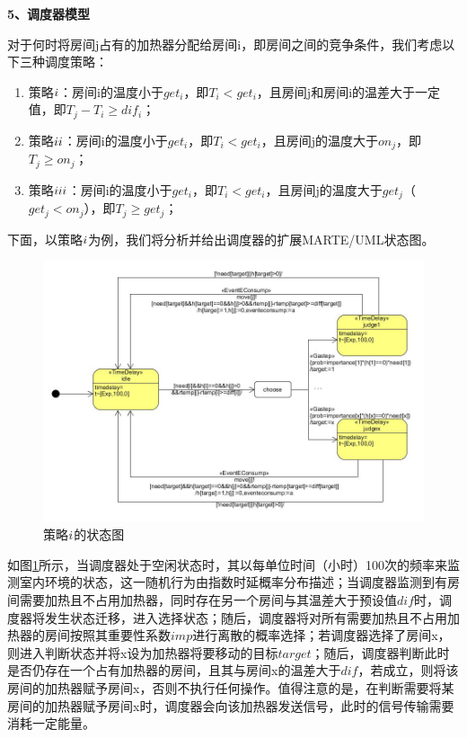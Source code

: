 \textbf{5、调度器模型}	

	对于何时将房间j占有的加热器分配给房间i，即房间之间的竞争条件，我们考虑以下三种调度策略：	
	\begin{enumerate}
	\item 策略$\uppercase\expandafter{\romannumeral1}$：房间i的温度小于$get_{i}$，即$T_{i} < get_{i}$，且房间j和房间i的温差大于一定值，即$T_{j}-T_{i} \geq dif_{i}$；
	\item 策略$\uppercase\expandafter{\romannumeral2}$：房间i的温度小于$get_{i}$，即$T_{i} < get_{i}$，且房间j的温度大于$on_{j}$，即$T_{j} \geq on_{j}$；
	\item 策略$\uppercase\expandafter{\romannumeral3}$：房间i的温度小于$get_{i}$，即$T_{i} < get_{i}$，且房间j的温度大于$get_{j}$（$get_{j}<on_{j}$），即$T_{j} \geq get_{j}$；
	\end{enumerate}

	下面，以策略$\uppercase\expandafter{\romannumeral1}$为例，我们将分析并给出调度器的扩展MARTE/UML状态图。
	
	\begin{figure}[!t]
	\centering
	\includegraphics[width=4.9in]{scheduler-sm.jpg}
	\caption{策略$\uppercase\expandafter{\romannumeral1}$的状态图}
	\label{scheduler-sm}
	\end{figure}
	
	如图\ref{scheduler-sm}所示，当调度器处于空闲状态时，其以每单位时间（小时）100次的频率来监测室内环境的状态，这一随机行为由指数时延概率分布描述；当调度器监测到有房间需要加热且不占用加热器，同时存在另一个房间与其温差大于预设值$dif$时，调度器将发生状态迁移，进入选择状态；随后，调度器将对所有需要加热且不占用加热器的房间按照其重要性系数$imp$进行离散的概率选择；若调度器选择了房间x，则进入判断状态并将x设为加热器将要移动的目标$target$；随后，调度器判断此时是否仍存在一个占有加热器的房间，且其与房间x的温差大于$dif$，若成立，则将该房间的加热器赋予房间x，否则不执行任何操作。值得注意的是，在判断需要将某房间的加热器赋予房间x时，调度器会向该加热器发送信号，此时的信号传输需要消耗一定能量。
	
